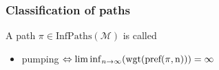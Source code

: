 \documentclass[onlymath]{beamer}
\begin{document}
\begin{frame}
	\frametitle{Classification of paths}
	A path $\pi \in \mathrm{InfPaths}(\mathcal{M})$ is called 
	\begin{itemize}
		\item pumping $\ratio\Leftrightarrow \liminf_{n \to \infty}(\mathrm{wgt}(\mathrm{pref(\pi, n)})) = \infty$
	\end{itemize}
\end{frame}





\begin{comment}


\begin{frame}
	\begin{itemize}
		\item endliche Pfade (konkreter Startknoten, Menge von Zielknoten)
		\item Kantengewichte
		\begin{center}%
			\begin{tikzpicture}[auto,swap,scale=3]
			
			\foreach \pos/\name in {{(0,0)/1}, {(1,0)/3}, {(2,0)/4}, {(0,1)/2}}
			\node[vertex] (\name) at \pos {$\name$};
			
			\foreach \pos/\name in {{(1,1)/6}, {(2,1)/5}}
			\node[target] (\name) at \pos {$\name$};
			
			\foreach \source/ \dest /\weight in {
				1/2/{\frac{1}{2}:4},
				2/6/{1:2},
				5/6/{1:3},
				6/5/{1:7}
			}
			\path[edge] (\source) to[bend left] node[weight]{$\weight$} (\dest);
			
			\foreach \source/ \dest /\weight in {
				1/3/{\frac{1}{2}:5},
				3/4/{\frac{1}{2}:2},
				4/5/{\frac{1}{5}:3}
			}
			\path[edge] (\source) to[bend right] node{$\weight$} (\dest);
			
			\foreach \source/ \dest /\weight in {
				3/2/{\frac{1}{4}:5},
				3/5/{\frac{1}{4}:3}
			}
			\path[edge] (\source) to node[weight]{$\weight$} (\dest);
			
			\foreach \source/ \dest /\weight in {
				4/4/{\frac{4}{5}:2}
			}
			\path[edge] (\source) to[loop right] node[weight]{$\weight$} (\dest);
			
			\path[edge] (-0.5,0) to (1);
			

\end{comment}
\end{document}
